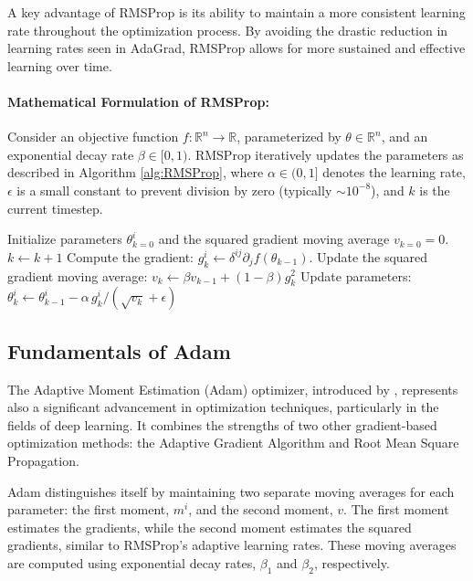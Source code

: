 \documentclass{article} %
\begin{document}
A key advantage of RMSProp is its ability to maintain a more consistent learning rate throughout the optimization process. By avoiding the drastic reduction in learning rates seen in AdaGrad, RMSProp allows for more sustained and effective learning over time.

\paragraph{Mathematical Formulation of RMSProp:} Consider an objective function \( f: \mathbb{R}^n \to \mathbb{R} \), parameterized by \( \theta \in \mathbb{R}^n \), and an exponential decay rate \( \beta \in [0,1) \). RMSProp iteratively updates the parameters as described in Algorithm \ref{alg:RMSProp}, where \( \alpha \in (0,1] \) denotes the learning rate, \( \epsilon \) is a small constant to prevent division by zero (typically \( \sim 10^{-8} \)), and \( k \) is the current timestep.

\begin{algorithm}
\caption{RMSProp Optimization Algorithm}
\label{alg:RMSProp}
\begin{algorithmic}[1] 
    \State Initialize parameters $\theta^i_{k=0}$ and the squared gradient moving average $v_{k=0} = 0$.
        \State $k \leftarrow k + 1$
        \State Compute the gradient: $g^i_{k} \leftarrow \delta^{ij} \partial_j f(\theta_{k-1})$.
        \State Update the squared gradient moving average: $v_{k} \leftarrow \beta v_{k-1} + (1 - \beta) g_{k}^2$
        \State Update parameters: $\theta^i_{k} \leftarrow \theta^i_{k-1} - \alpha\, g^i_{k}/(\sqrt{v_{k}} + \epsilon)$
    \EndWhile
\end{algorithmic}
\end{algorithm}

\subsection{Fundamentals of Adam}

The Adaptive Moment Estimation (Adam) optimizer, introduced by \cite{kingma2014}, represents also a significant advancement in optimization techniques, particularly in the fields of deep learning. It combines the strengths of two other gradient-based optimization methods: the Adaptive Gradient Algorithm and Root Mean Square Propagation. 

Adam distinguishes itself by maintaining two separate moving averages for each parameter: the first moment, \( m^i \), and the second moment, \( v \). The first moment estimates the gradients, while the second moment estimates the squared gradients, similar to RMSProp's adaptive learning rates. These moving averages are computed using exponential decay rates, \( \beta_1 \) and \( \beta_2 \), respectively.
\end{document}
